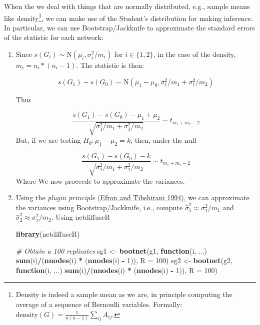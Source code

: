 \documentclass[
]{book}
\newenvironment{Shaded}{\begin{snugshade}}{\end{snugshade}}
\newcommand{\AttributeTok}[1]{\textcolor[rgb]{0.13,0.29,0.53}{#1}}
\newcommand{\CommentTok}[1]{\textcolor[rgb]{0.56,0.35,0.01}{\textit{#1}}}
\newcommand{\ControlFlowTok}[1]{\textcolor[rgb]{0.13,0.29,0.53}{\textbf{#1}}}
\newcommand{\DecValTok}[1]{\textcolor[rgb]{0.00,0.00,0.81}{#1}}
\newcommand{\FunctionTok}[1]{\textcolor[rgb]{0.13,0.29,0.53}{\textbf{#1}}}
\newcommand{\NormalTok}[1]{#1}
\newcommand{\OtherTok}[1]{\textcolor[rgb]{0.56,0.35,0.01}{#1}}
\newcommand{\SpecialCharTok}[1]{\textcolor[rgb]{0.81,0.36,0.00}{\textbf{#1}}}
\begin{document}
When the we deal with things that are normally distributed, e.g., sample means
like density\footnote{Density is indeed a sample mean as we are, in principle
  computing the average of a sequence of Bernoulli variables. Formally:
  \(\mbox{density}(G) = \frac{1}{n(n-1)}\sum_{ij}A_{ij}\).},
we can make use of the Student's distribution for making inference. In particular,
we can use Bootstrap/Jackknife to approximate the standard errors of the statistic
for each network:

\begin{enumerate}
\def\labelenumi{\arabic{enumi}.}
\item
  Since \(s(G_i)\sim \mbox{N}(\mu_i,\sigma_i^2/m_i)\) for \(i\in\{1,2\}\), in the case
  of the density, \(m_i = n_i * (n_i - 1)\). The statistic is then:

  \[
  s(G_1) - s(G_0)\sim \mbox{N}(\mu_1-\mu_0, \sigma_1^2/m_1 + \sigma_1^2/m_2)
  \]

  Thus

  \[
  \frac{s(G_1) - s(G_0) - \mu_1 + \mu_2}{\sqrt{\sigma_1^2/{m_1} + \sigma_1^2/{m_2}}} \sim t_{m_1 + m_2 - 2}
  \]
  But, if we are testing \(H_0: \mu_1 - \mu_2 = k\), then, under the null

  \[
  \frac{s(G_1) - s(G_0) - k}{\sqrt{\sigma_1^2/{m_1} + \sigma_1^2/{m_2}}} \sim t_{m_1 + m_2 - 2}
  \]
  Where We now proceede to approximate the variances.
\item
  Using the \emph{plugin principle} (\protect\hyperlink{ref-Efron1994}{Efron and Tibshirani 1994}), we can approximate the variances
  using Bootstrap/Jackknife, i.e., compute \(\hat\sigma_1^2\approx\sigma_1^2/m_1\) and
  \(\hat\sigma_2^2\approx\sigma_2^2/m_2\). Using netdiffuseR

\begin{Shaded}
\begin{Highlighting}[]
\FunctionTok{library}\NormalTok{(netdiffuseR)}

\CommentTok{\# Obtain a 100 replicates}
\NormalTok{sg1 }\OtherTok{\textless{}{-}} \FunctionTok{bootnet}\NormalTok{(g1, }\ControlFlowTok{function}\NormalTok{(i, ...) }\FunctionTok{sum}\NormalTok{(i)}\SpecialCharTok{/}\NormalTok{(}\FunctionTok{nnodes}\NormalTok{(i) }\SpecialCharTok{*}\NormalTok{ (}\FunctionTok{nnodes}\NormalTok{(i) }\SpecialCharTok{{-}} \DecValTok{1}\NormalTok{)), }\AttributeTok{R =} \DecValTok{100}\NormalTok{)}
\NormalTok{sg2 }\OtherTok{\textless{}{-}} \FunctionTok{bootnet}\NormalTok{(g2, }\ControlFlowTok{function}\NormalTok{(i, ...) }\FunctionTok{sum}\NormalTok{(i)}\SpecialCharTok{/}\NormalTok{(}\FunctionTok{nnodes}\NormalTok{(i) }\SpecialCharTok{*}\NormalTok{ (}\FunctionTok{nnodes}\NormalTok{(i) }\SpecialCharTok{{-}} \DecValTok{1}\NormalTok{)), }\AttributeTok{R =} \DecValTok{100}\NormalTok{)}


\end{Highlighting}
\end{Shaded}
\end{enumerate}
\end{document}
